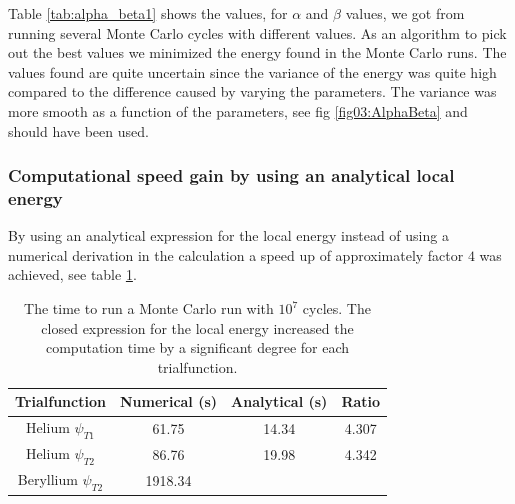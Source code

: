		Table \ref{tab:alpha_beta1} shows the values, for \(\alpha\) and \(\beta\) values, we got from  running several Monte Carlo cycles with different values. As an algorithm to pick out the best values we minimized the energy found in the Monte Carlo runs. The values found are quite uncertain since the variance of the energy was quite high compared to the difference caused by varying the parameters. The variance was more smooth as a function of the parameters, see fig \ref{fig03:AlphaBeta} and should have been used.




	\subsubsection{Computational speed gain by using an analytical local energy}
		By using an analytical expression for the local energy instead of using a numerical derivation in the calculation a speed up of approximately factor \(4\) was achieved, see table \ref{tab:analyticVSNumeric}.

		\begin{table}
			\center
			\begin{tabular}{| c | c | c | c |}
			    \hline
			   	\textbf{Trialfunction} & Numerical (s) & Analytical (s) & Ratio
			    \\ \hline
			    Helium $\psi_{T1}$ & 61.75 & 14.34 & 4.307
			    \\ \hline
			    Helium $\psi_{T2}$ & 86.76 & 19.98	& 4.342
			    \\	\hline
			    Beryllium $\psi_{T2}$ & 1918.34  &	 &
				    \\ \hline
			\end{tabular}
			\caption{The time to run a Monte Carlo run with \(10^7\) cycles. The closed expression for the local energy increased the computation time by a significant degree for each trialfunction. }
			\label{tab:analyticVSNumeric}
		\end{table}